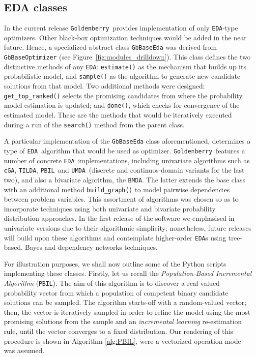 \documentclass{sig-alternate}
\newcommand{\GB}{\texttt{Goldenberry}}
\newcommand{\PBIL}{\texttt{PBIL}}
\newcommand{\UMDA}{\texttt{UMDA}}
\newcommand{\BMDA}{\texttt{BMDA}}
\newcommand{\cGA}{\texttt{cGA}}
\newcommand{\EDA}{\texttt{EDA}}
\newcommand{\TILDA}{\texttt{TILDA}}
\newcommand{\figref}[1]{\mbox{Figure \ref{#1}}}
\begin{document}
\subsection{EDA classes}
In the current release \GB~provides implementation of only \EDA-type optimizers. Other black-box optimization techniques would be added in the near future. Hence, a specialized abstract class \texttt{GbBaseEda} was derived from \texttt{GbBaseOptimizer} (see \figref{fig:modules_drilldown}). This class defines the two distinctive methods of any \EDA: \texttt{estimate()} as the mechanism that builds up its probabilistic model, and \texttt{sample()} as the algorithm to generate new candidate solutions from that model. Two additional methods were designed: \texttt{get\_top\_ranked()} selects the promising candidates from where the probability model estimation is updated; and \texttt{done()}, which checks for convergence of the estimated model. These are the methods that would be iteratively executed during a run of the \texttt{search()} method from the parent class.

A particular implementation of the \texttt{GbBaseEda} class aforementioned, determines a type of \EDA~algorithm that would be used as optimizer. \GB~features a number of concrete \EDA~implementations, including univariate algorithms such as \cGA, \TILDA, \PBIL~and \UMDA~(discrete and continuos-domain variants for the last two), and also a bivariate algorithm, the \BMDA. The latter extends the base class with an additional method \texttt{build\_graph()} to model pairwise dependencies between problem variables. This assortment of algorithms was chosen so as to incorporate techniques using both univariate and bivariate probability distribution approaches. In the first release of the software we emphasised in univariate versions due to their algorithmic simplicity; nonetheless, future releases will build upon these algorithms and contemplate higher-order \EDA  s using tree-based, Bayes and dependency networks techniques.

For illustration purposes, we shall now outline some of the Python scripts implementing these classes. Firstly, let us recall the \textit{Population-Based Incremental Algorithm} (\PBIL)\cite{Baluja95}. The aim of this algorithm is to discover a real-valued probability vector from which a population of competent  binary candidate solutions can be sampled. The algorithm starts-off with a random-valued vector; then, the vector is iteratively sampled in order to refine the model using the most promising solutions from the sample and an \emph{incremental learning} re-estimation rule, until the vector converges to a fixed distribution. Our rendering of this procedure is shown in Algorithm \ref{alg:PBIL}, were a vectorized operation mode was assumed.
\end{document}
